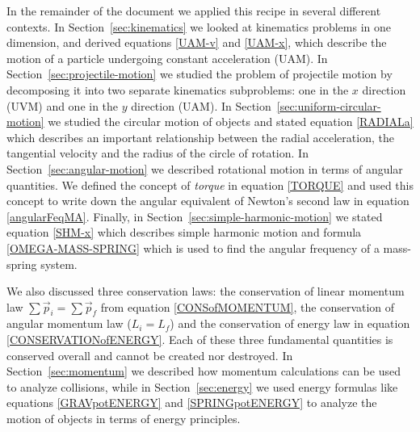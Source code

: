\documentclass[letterpaper,9pt,journal]{IEEEtran}
\begin{document}
In the remainder of the document we applied this recipe in several different contexts.
In Section~\ref{sec:kinematics} we looked at kinematics problems in one dimension,
and derived equations \eqref{UAM-v} and \eqref{UAM-x}, 
which describe the motion of a particle undergoing constant acceleration (UAM).
%
In Section~\ref{sec:projectile-motion} we studied the problem of projectile motion by decomposing it into
two separate kinematics subproblems: one in the $x$ direction (UVM) and one in the $y$ direction (UAM).
%
In Section~\ref{sec:uniform-circular-motion} we studied the circular motion of objects %
and stated equation \eqref{RADIALa} which describes an important relationship between the radial acceleration,
the tangential velocity and the radius of the circle of rotation.
%
In Section~\ref{sec:angular-motion} we described rotational motion in terms of angular quantities.
We defined the concept of \emph{torque} in equation \eqref{TORQUE} and used this
concept to write down the angular equivalent of Newton's second law in equation \eqref{angularFeqMA}.
%
Finally, in Section~\ref{sec:simple-harmonic-motion} we stated equation \eqref{SHM-x}
which describes simple harmonic motion and formula \eqref{OMEGA-MASS-SPRING} 
which is used to find the angular frequency of a mass-spring system.

%



We also discussed three conservation laws:
the conservation of linear momentum law $\sum\vec{p}_{i} = \sum\vec{p}_{f}$ 
from equation \eqref{CONSofMOMENTUM}, 
the conservation of angular momentum law ($L_{i} = L_{f}$) and the conservation of  energy law %
in equation \eqref{CONSERVATIONofENERGY}.
Each of these three fundamental quantities is conserved overall and cannot be created nor destroyed. 
In Section~\ref{sec:momentum} we described how momentum calculations can be used to analyze collisions,
while in Section~\ref{sec:energy} we used energy formulas like 
equations  \eqref{GRAVpotENERGY} and  \eqref{SPRINGpotENERGY} to analyze the motion of objects in
terms of energy principles.
%
\end{document}
